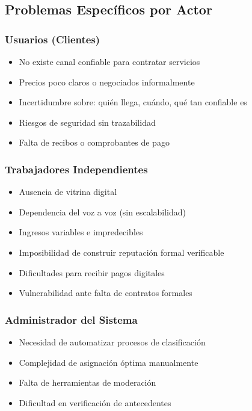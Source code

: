 \documentclass[12pt,a4paper,spanish]{article}
\begin{document}
\subsection{Problemas Específicos por Actor}

\subsubsection{Usuarios (Clientes)}

\begin{itemize}
    \item No existe canal confiable para contratar servicios
    \item Precios poco claros o negociados informalmente
    \item Incertidumbre sobre: quién llega, cuándo, qué tan confiable es
    \item Riesgos de seguridad sin trazabilidad
    \item Falta de recibos o comprobantes de pago
\end{itemize}

\subsubsection{Trabajadores Independientes}

\begin{itemize}
    \item Ausencia de vitrina digital
    \item Dependencia del voz a voz (sin escalabilidad)
    \item Ingresos variables e impredecibles
    \item Imposibilidad de construir reputación formal verificable
    \item Dificultades para recibir pagos digitales
    \item Vulnerabilidad ante falta de contratos formales
\end{itemize}

\subsubsection{Administrador del Sistema}

\begin{itemize}
    \item Necesidad de automatizar procesos de clasificación
    \item Complejidad de asignación óptima manualmente
    \item Falta de herramientas de moderación
    \item Dificultad en verificación de antecedentes
\end{itemize}
\end{document}
